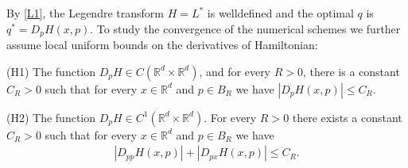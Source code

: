 \documentclass[a4paper,  twoside, 10pt, leqno]{amsart}
\newcommand{\rd}{\mathbb{R}^d}
\theoremstyle{remark}
\theoremstyle{definition}
\newenvironment{description*}%
  {\begin{description}
    \setlength{\itemsep}{0.33em}
  }
  {\end{description}}
\begin{document}
%
%   
%  
%  

By \ref{L1}, the Legendre transform $H= L^*$ is welldefined and the optimal $q$ is $q^* = D_p H(x,p)$. To study the convergence of the numerical schemes we further assume local uniform bounds on the derivatives of Hamiltonian: \smallskip

\begin{description*}
\item[(H1)\label{H1}] The function $D_p H \in C (\rd \times \rd)$, and for every
$R >0$, there is a constant $C_R>0$ such that for every $x\in \rd$ and $p\in B_R$ we have $|D_p H (x,p) | \leq C_R$.  \medskip
 \item[(H2)\label{H2}]  The function $D_p H\in C^1(\rd\times \rd)$.  For every $R>0$ there exists a constant $C_R>0$ such that for every $x\in \rd$ and $p\in B_R$ we have 
\begin{align*}
|D_{pp}H(x,p)| + |D_{px} H(x,p)| \leq C_R.
\end{align*}
\end{description*}
\end{document}
